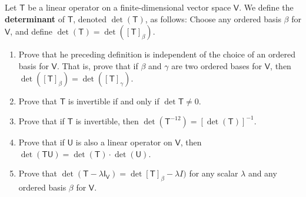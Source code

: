 Let $\mathsf{T}$ be a linear operator on a finite-dimensional vector
space $\mathsf{V}$. We define the {\bf determinant} of $\mathsf{T}$,
denoted $\det{(\mathsf{T})}$, as follows: Choose any ordered basis
$\beta$ for $\mathsf{V}$, and define $\det{(\mathsf{T})}=
\det{([\mathsf{T}]_\beta )}$.
\begin{enumerate}
\item Prove that he preceding definition is independent of the choice
  of an ordered basis for $\mathsf{V}$. That is, prove that if $\beta$
  and $\gamma$ are two ordered bases for $\mathsf{V}$, then $\det{([\mathsf{T}]_\beta)}=\det{([\mathsf{T}]_\gamma)}$.
\item Prove that $\mathsf{T}$ is invertible if and only if
  $\det{\mathsf{T}}\neq 0$.
\item Prove that if $\mathsf{T}$ is invertible, then
  $\det{(\mathsf{T}^{-12})}= [\det{(\mathsf{T})}]^{-1}$.
\item Prove that if $\mathsf{U}$ is also a linear operator on
  $\mathsf{V}$, then $\det{(\mathsf{TU})} = \det{(\mathsf{T})}\cdot\det{(\mathsf{U})}$.
\item Prove that $\det{(\mathsf{T}-\lambda \mathsf{I}_\mathsf{V})} =
    \det{[\mathsf{T}]_\beta -\lambda I)}$ for any scalar $\lambda$ and
      any ordered basis $\beta$ for $\mathsf{V}$.
\end{enumerate}
